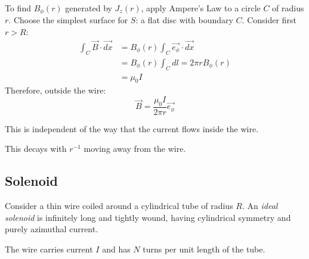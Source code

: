 \documentclass[../Main.tex]{subfiles}
\begin{document}
To find $B_\phi(r)$ generated by $J_z(r)$, apply Ampere's Law to a circle $C$ of radius $r$. Choose the simplest surface for $S$: a flat disc with boundary $C$. Consider first $r > R$:
\begin{align*}
    \int_C \vec{B} \cdot \vec{dx} &= B_\phi(r) \int_C \vec{e_\phi} \cdot \vec{dx} \\
    &= B_\phi(r) \int_C dl = 2\pi r B_\phi(r) \\
    &= \mu_0 I
\end{align*}
Therefore, outside the wire:
\begin{equation*}
    \vec{B} = \frac{\mu_0 I}{2\pi r} \vec{e_\phi}
\end{equation*}
\begin{remarks}
    \item This is independent of the way that the current flows inside the wire.
    \item This decays with $r^{-1}$ moving away from the wire.
\end{remarks}
\subsection{Solenoid}
Consider a thin wire coiled around a cylindrical tube of radius $R$. An \textit{ideal solenoid} is infinitely long and tightly wound, having cylindrical symmetry and purely azimuthal current.

The wire carries current $I$ and has $N$ turns per unit length of the tube.
\end{document}
